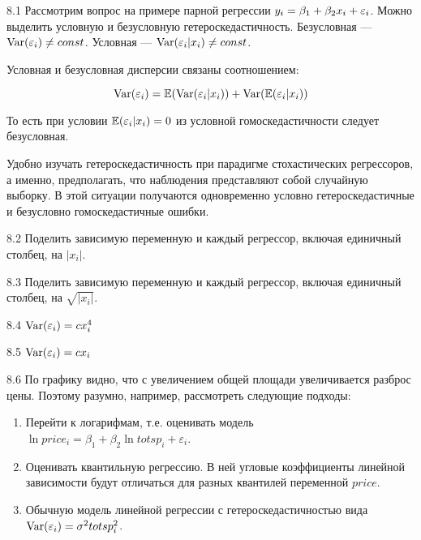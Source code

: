 \protect \hypertarget {soln:8.1}{}
\begin{solution}{{8.1}}
Рассмотрим вопрос на примере парной регрессии $y_i = \beta_1 + \beta_2 x_i + \varepsilon_i$. Можно выделить условную и безусловную гетероскедастичность. Безусловная — $\operatorname{Var}(\varepsilon_i)\neq const$. Условная — $\operatorname{Var}(\varepsilon_i | x_i) \neq const$.

Условная и безусловная дисперсии связаны соотношением:

\[
\operatorname{Var}(\varepsilon_i) = \mathbb{E}(\operatorname{Var}(\varepsilon_i|x_i)) + \operatorname{Var}(\mathbb{E}(\varepsilon_i|x_i))
\]

То есть при условии $\mathbb{E}(\varepsilon_i |x_i)=0$ из условной гомоскедастичности следует безусловная.

Удобно изучать гетероскедастичность при парадигме стохастических регрессоров, а именно, предполагать, что наблюдения представляют собой случайную выборку. В этой ситуации получаются одновременно условно гетероскедастичные и безусловно гомоскедастичные ошибки.
\end{solution}
\protect \hypertarget {soln:8.2}{}
\begin{solution}{{8.2}}
Поделить зависимую переменную и каждый регрессор, включая единичный столбец, на $|x_i|$.
\end{solution}
\protect \hypertarget {soln:8.3}{}
\begin{solution}{{8.3}}
Поделить зависимую переменную и каждый регрессор, включая единичный столбец, на $\sqrt{|x_i|}$.
\end{solution}
\protect \hypertarget {soln:8.4}{}
\begin{solution}{{8.4}}
$\operatorname{Var}(\varepsilon_i)=cx_i^4$
\end{solution}
\protect \hypertarget {soln:8.5}{}
\begin{solution}{{8.5}}
$\operatorname{Var}(\varepsilon_i)=c x_i$
\end{solution}
\protect \hypertarget {soln:8.6}{}
\begin{solution}{{8.6}}
По графику видно, что с увеличением общей площади увеличивается разброс цены. Поэтому разумно, например, рассмотреть следующие подходы:
\begin{enumerate}
\item Перейти к логарифмам, т.е. оценивать модель $\ln price_i=\beta_1+\beta_2 \ln totsp_i +\varepsilon_i$.
\item Оценивать квантильную регрессию. В ней угловые коэффициенты линейной зависимости будут отличаться для разных квантилей переменной $price$.
\item Обычную модель линейной регрессии с гетероскедастичностью вида $\operatorname{Var}(\varepsilon_i)=\sigma^2 totsp_i^2$.
\end{enumerate}
\end{solution}
